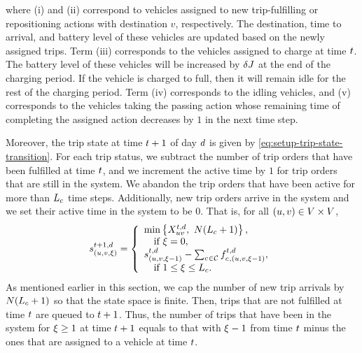where (i) and (ii) correspond to vehicles assigned to new trip-fulfilling or repositioning actions with destination $v$, respectively. The destination, time to arrival, and battery level of these vehicles are updated based on the newly assigned trips. Term (iii) corresponds to the vehicles assigned to charge at time $\time$. The battery level of these vehicles will be increased by $\delta \chargetime$ at the end of the charging period. If the vehicle is charged to full, then it will remain idle for the rest of the charging period. Term (iv) corresponds to the idling vehicles, and (v) corresponds to the vehicles taking the passing action whose remaining time of completing the assigned action decreases by $1$ in the next time step. 

Moreover, the trip state at time $\time+1$ of day $\day$ is given by \eqref{eq:setup-trip-state-transition}. For each trip status, we subtract the number of trip orders that have been fulfilled at time $\time$, and we increment the active time by $1$ for trip orders that are still in the system. We abandon the trip orders that have been active for more than $\Lc$ time steps. Additionally, new trip orders arrive in the system and we set their active time in the system to be $0$. That is, for all $(\origin, \destination) \in \Region \times \Region$,
\begin{align}\label{eq:setup-trip-state-transition}
     \state{(\origin, \destination, \xi)}{\time + 1, \day} = \left\{
     \begin{array}{ll}
                  \min\left\{\arrnum{\origin\destination}{\time, d}, \  \Size (\Lc + 1) \right\},  \\
                  \quad \text{if $\tripactivetime=0$}, \\
                  \state{(\origin, \destination, \tripactivetime - 1)}{\time,\day} - \sum_{\cartype{}  \in \Cartype} \jointtripfulfillaction{\cartype{}, (\origin, \destination, \tripactivetime-1)}{\time,\day}, \\
                  \quad \text{if $1 \leq \tripactivetime \leq \Lc$}.  
     \end{array}
     \right.
\end{align}
As mentioned earlier in this section, we cap the number of new trip arrivals by $\Size(\Lc+1)$ so that the state space is finite. Then, trips that are not fulfilled at time $\time$ are queued to $\time+1$. Thus, the number of trips that have been in the system for $\tripactivetime \geq 1$ at time $\time+1$ equals to that with $\tripactivetime-1$ from time $\time$ minus the ones that are assigned to a vehicle at time $\time$.  

